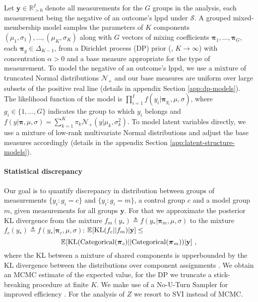 Let $\mathbf y \in \mathbb R_{>0}^I$ denote all measurements for the $G$ groups in the analysis, each measurement being the negative of an outcome's lppd under $\mathcal S$. A grouped mixed-membership model samples the parameters of $K$ components $(\mu_1, \sigma_1), \ldots, (\mu_K, \sigma_K)$ along with $G$ vectors of mixing coefficients $\boldsymbol\pi_1, \ldots, \boldsymbol\pi_G$, each $\boldsymbol\pi_g \in \Delta_{K-1}$, from a Dirichlet process (DP) prior (\ie, $K \to \infty$) with concentration $\alpha > 0$ and a base measure appropriate for the type of measurement. To model the negative of an outcome's lppd, we use a mixture of truncated Normal distributions $\mathcal N_{+}$ and our base measures are uniform over large subsets of the positive real line (details in appendix Section \ref{app:dp-models}). The likelihood function of the model is $\prod_{i=1}^I f(y_i|\boldsymbol\pi_{g_i},\mu,\sigma)$, where $g_i \in \{1, \ldots, G\}$ indicates the group to which $y_i$ belongs and $f(y|\boldsymbol\pi,\mu,\sigma) = \sum_{k=1}^K \pi_{k} \mathcal N_{+}(y|\mu_{k}, \sigma_{k}^2)$. 
To model latent variables directly, we use a mixture of low-rank multivariate Normal distributions and adjust the base measures accordingly (details in the appendix Section \ref{app:latent-structure-models}).


\paragraph{Statistical discrepancy}
Our goal is to quantify discrepancy in distribution between groups of measurements $\{y_i: g_i = c\}$ and $\{y_i: g_i = m\}$, a control group $c$ and a model group $m$, given measurements for all groups $\mathbf y$. 
For that we approximate the posterior KL divergence from the mixture $f_m(y_*) \triangleq f(y_*|\boldsymbol\pi_m, \mu, \sigma)$ to the mixture $f_c(y_*) \triangleq f(y_*|\boldsymbol\pi_c, \mu, \sigma)$: $\mathbb E_{}[\operatorname{KL}(f_c || f_m) | \mathbf y] \le$
\begin{equation}
    \mathbb E_{}[\operatorname{KL}(\mathrm{Categorical}(\boldsymbol\pi_c) || \mathrm{Categorical}(\boldsymbol\pi_m)) | \mathbf y] ~,
\end{equation}
where the KL between a mixture of shared components is upperbounded by the KL divergence between the distributions over component assignments \citep{hershey2007approximating}. 
We obtain an MCMC estimate of the expected value, for the DP we truncate a stick-breaking procedure at finite $K$. We make use of a No-U-Turn Sampler for improved efficiency \citep{hoffman2014nuts}. For the analysis of $Z$ we resort to SVI instead of MCMC. 


